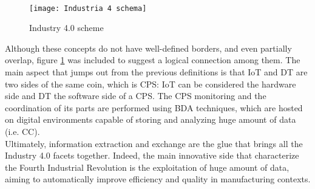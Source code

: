\paragraph{ }
\begin{figure}[h] 
\centering    
\texttt{[image: Industria 4 schema]}
\caption{Industry 4.0 scheme}
\label{fig:Industria 4 schema}
\end{figure}
Although these concepts do not have well-defined borders, and even partially overlap, figure \ref{fig:Industria 4 schema} was included to suggest a logical connection among them. The main aspect that jumps out from the previous definitions is that IoT and DT are two sides of the same coin, which is CPS: IoT can be considered the hardware side and DT the software side of a CPS. The CPS monitoring and the coordination of its parts are performed using BDA techniques, which are hosted on digital environments capable of storing and analyzing huge amount of data (i.e. CC).\\
Ultimately, information extraction and exchange are the glue that brings all the Industry 4.0 facets together. Indeed, the main innovative side that characterize the Fourth Industrial Revolution is the exploitation of huge amount of data, aiming to automatically improve efficiency and quality in manufacturing contexts. 
